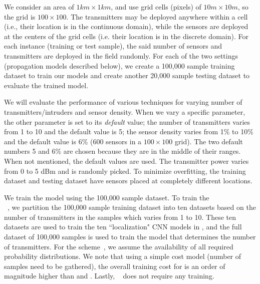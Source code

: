 We consider an area
of $1km \times 1km$, and use grid cells (pixels) of 
$10 m \times 10 m$, so the grid is $100\times100$. 
The transmitters may be deployed
anywhere within a cell (i.e., their location is in the continuous
domain), while the sensors are deployed at the centers of the grid cells (i.e. their location is in the discrete domain).
For each instance (training or test sample), the said number of sensors and transmitters are deployed in the field randomly. 
For each of the two settings (propagation models described below), we create a 100,000 sample training dataset 
to train our models and create another 20,000 sample testing dataset to evaluate the trained model. 

We will evaluate the performance of various techniques for
varying number of transmitters/intruders and sensor
density. When we vary a specific parameter, the other parameter
is set to its \emph{default} value; the number of transmitters varies from 1 to 10 and 
the default value is 5; the sensor density varies from 1\% to 10\% and the default value is 6\% (600  sensors in a $100\times100$ grid).
The two default numbers 5 and 6\% are chosen because they are in the middle of their ranges.
When not mentioned, the default values are used.
The transmitter power varies from 0 to 5 dBm and is randomly picked.
To minimize overfitting, the training dataset and testing dataset have sensors placed at completely different locations.

We train the \our model using the 100,000 sample dataset. To train the \\
\deeptx~\cite{icccn20-deeptxfinder}, we partition the 100,000 sample training dataset into 
ten datasets based on the number of transmitters in the samples which varies from 1 to 10. 
These ten datasets are used to train the ten ``localization" CNN models in \deeptx, and the 
full dataset of 100,000 samples is used to train the \deeptx model that determines the number of transmitters. 
For the \map scheme~\cite{ipsn20-mtl}, we assume the availability of all required 
probability distributions. We note that using a simple cost model (number of samples need to be gathered), 
the overall training cost for \map is an order of magnitude higher than \our and \deeptx. 
Lastly, \splot~\cite{mobicom17-splot} does not require any training.




